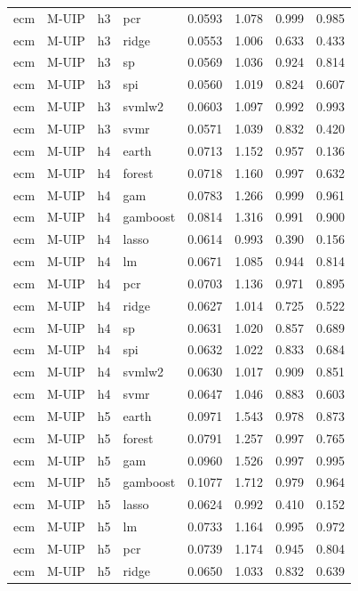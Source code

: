\begin{ThreePartTable}
\begin{longtable}[t]{llclcccc}
ecm & M-UIP & h3 & pcr & 0.0593 & 1.078 & 0.999 & 0.985\\
ecm & M-UIP & h3 & ridge & 0.0553 & 1.006 & 0.633 & 0.433\\
ecm & M-UIP & h3 & sp & 0.0569 & 1.036 & 0.924 & 0.814\\
ecm & M-UIP & h3 & spi & 0.0560 & 1.019 & 0.824 & 0.607\\
ecm & M-UIP & h3 & svmlw2 & 0.0603 & 1.097 & 0.992 & 0.993\\
ecm & M-UIP & h3 & svmr & 0.0571 & 1.039 & 0.832 & 0.420\\
\addlinespace
ecm & M-UIP & h4 & earth & 0.0713 & 1.152 & 0.957 & 0.136\\
ecm & M-UIP & h4 & forest & 0.0718 & 1.160 & 0.997 & 0.632\\
ecm & M-UIP & h4 & gam & 0.0783 & 1.266 & 0.999 & 0.961\\
ecm & M-UIP & h4 & gamboost & 0.0814 & 1.316 & 0.991 & 0.900\\
ecm & M-UIP & h4 & lasso & 0.0614 & 0.993 & 0.390 & 0.156\\
ecm & M-UIP & h4 & lm & 0.0671 & 1.085 & 0.944 & 0.814\\
ecm & M-UIP & h4 & pcr & 0.0703 & 1.136 & 0.971 & 0.895\\
ecm & M-UIP & h4 & ridge & 0.0627 & 1.014 & 0.725 & 0.522\\
ecm & M-UIP & h4 & sp & 0.0631 & 1.020 & 0.857 & 0.689\\
ecm & M-UIP & h4 & spi & 0.0632 & 1.022 & 0.833 & 0.684\\
ecm & M-UIP & h4 & svmlw2 & 0.0630 & 1.017 & 0.909 & 0.851\\
ecm & M-UIP & h4 & svmr & 0.0647 & 1.046 & 0.883 & 0.603\\
\addlinespace
ecm & M-UIP & h5 & earth & 0.0971 & 1.543 & 0.978 & 0.873\\
ecm & M-UIP & h5 & forest & 0.0791 & 1.257 & 0.997 & 0.765\\
ecm & M-UIP & h5 & gam & 0.0960 & 1.526 & 0.997 & 0.995\\
ecm & M-UIP & h5 & gamboost & 0.1077 & 1.712 & 0.979 & 0.964\\
ecm & M-UIP & h5 & lasso & 0.0624 & 0.992 & 0.410 & 0.152\\
ecm & M-UIP & h5 & lm & 0.0733 & 1.164 & 0.995 & 0.972\\
ecm & M-UIP & h5 & pcr & 0.0739 & 1.174 & 0.945 & 0.804\\
ecm & M-UIP & h5 & ridge & 0.0650 & 1.033 & 0.832 & 0.639\\

\end{longtable}
\end{ThreePartTable}
